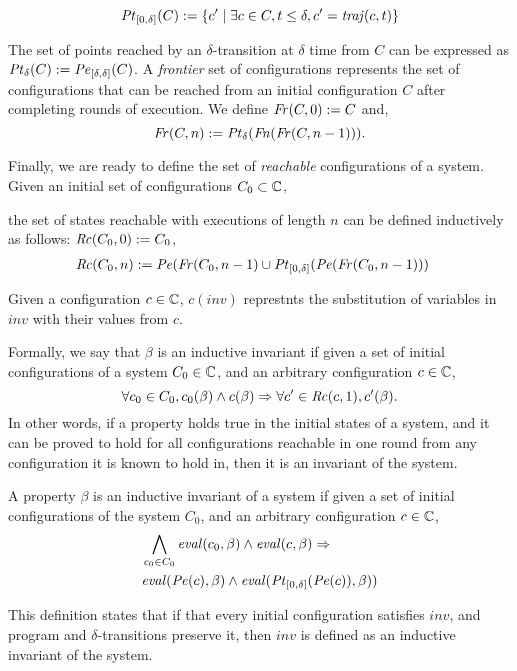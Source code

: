 $$\mathit{Pt}_{[0,\delta]}(C) := \left\{c^\prime \mid \exists c\in C, t\leq \delta , c^\prime = \mathit{traj}(c,t)\right\}$$

The set of points reached by an $\delta$-transition at $\delta$ time from $C$ can be expressed as $\mathit{Pt}_\delta(C) := \mathit{Pe}_{[\delta,\delta]}(C)$. A \emph{frontier} set of configurations represents the set of configurations that can be reached from an initial configuration $C$ after completing rounds of execution. We define $\mathit{Fr}(C,0) := C$ and,
$$\mathit{Fr}(C,n) := \mathit{Pt}_\delta(\mathit{Fn}(\mathit{Fr}(C,n-1))).$$

Finally, we are ready to define the set of \emph{reachable} configurations of a system. Given an initial set of configurations $C_0\subset\mathbb{C}$,

the set of states reachable with executions of length $n$ can be defined inductively as follows: $\mathit{Rc}(C_0,0) := C_0$,
\begin{align*}
\mathit{Rc}(C_0,n) &:= \mathit{Pe}(\mathit{Fr}(C_0,n-1) \cup \mathit{Pt}_{[0,\delta]}(\mathit{Pe}(\mathit{Fr}(C_0,n-1)))
\end{align*}

Given a configuration $c \in \mathbb{C}$, $c(\mathit{inv})$ represtnts the substitution of variables in $\mathit{inv}$ with their values from $c$.

 Formally, we say that $\beta$ is an inductive invariant if given a set of initial configurations of a system $C_0 \in \mathbb{C}$, and an arbitrary configuration $c \in \mathbb{C}$,  $$\forall c_0 \in C_0, c_0(\beta) \wedge c(\beta) \Rightarrow \forall c^\prime \in \mathit{Rc}(c,1), c^\prime(\beta).$$ In other words, if a property holds true in the initial states of a system, and it can be proved to hold for all configurations reachable in one round from any configuration it is known to hold in, then it is an invariant of the system.


\begin{definition}
\label{def:ii}
A property $\beta$ is an inductive invariant of a system if given a set of initial configurations of the system $C_0$, and an arbitrary configuration $c\in \mathbb{C}$,
\begin{align*}
&\bigwedge_{c_0\in C_0}\mathit{eval}(c_0, \beta) \wedge \mathit{eval}(c,\beta) \Rightarrow\\ &\mathit{eval}(\mathit{Pe}(c),\beta)\wedge \mathit{eval}(\mathit{Pt}_{[0,\delta]}(\mathit{Pe}(c)),\beta))
\end{align*}
\end{definition}


This definition states that if that every initial configuration satisfies $\mathit{inv}$, and  program and $\delta$-transitions preserve it, then $\mathit{inv}$ is defined as an inductive invariant of the system.


